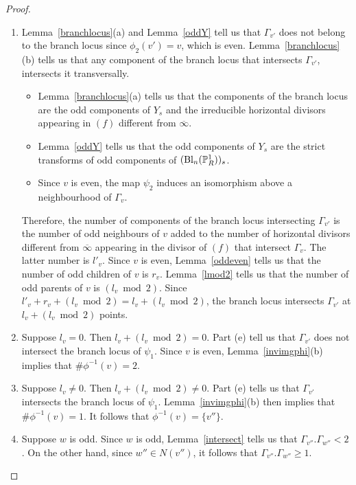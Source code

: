 \begin{proof}
\begin{enumerate}[\upshape (a)]
  \item Lemma~\ref{branchlocus}(a) and Lemma~\ref{oddY} tell us that $\Gamma_{v'}$ does not belong to the branch locus since $\phi_2(v') = v$, which is even. Lemma~\ref{branchlocus}(b) tells us that any component of the branch locus that intersects $\Gamma_{v'}$, intersects it transversally. 
  \begin{itemize}
   \item Lemma~\ref{branchlocus}(a) tells us that the components of the branch locus are the odd components of $Y_s$ and the irreducible horizontal divisors appearing in $(f)$ different from $\overline{\infty}$.
   \item Lemma~\ref{oddY} tells us that the odd components of $Y_s$ are the strict transforms of odd components of $(\mathrm{Bl}_n(\P^1_R))_s$. 
   \item Since $v$ is even, the map $\psi_2$ induces an isomorphism above a neighbourhood of $\Gamma_v$. \end{itemize}
   Therefore, the number of components of the branch locus intersecting $\Gamma_{v'}$ is the number of odd neighbours of $v$ added to the number of horizontal divisors different from $\overline{\infty}$ appearing in the divisor of $(f)$ that intersect $\Gamma_v$. The latter number is $l'_v$. Since $v$ is even, Lemma~\ref{oddeven} tells us that the number of odd children of $v$ is $r_v$. Lemma~\ref{lmod2} tells us that the number of odd parents of $v$ is $(l_v \bmod 2)$. Since $l'_v+r_v+(l_v \bmod 2) = l_v + (l_v \bmod 2)$, the branch locus intersects $\Gamma_{v'}$ at $l_v + (l_v \bmod 2)$ points.
  
  \item Suppose $l_v = 0$. Then $l_v + (l_v \bmod 2) = 0$. Part (e) tell us that $\Gamma_{v'}$ does not intersect the branch locus of $\psi_1$. Since $v$ is even, Lemma~\ref{invimgphi}(b) implies that $\# \phi^{-1}(v) = 2$.
  
  \item Suppose $l_v \neq 0$. Then $l_v + (l_v \bmod 2) \neq 0$. Part (e) tells us that $\Gamma_{v'}$ intersects the branch locus of $\psi_1$. Lemma~\ref{invimgphi}(b) then implies that $\# \phi^{-1}(v) = 1$. It follows that $\phi^{-1}(v) = \{ v'' \}$.
  
  \item Suppose $w$ is odd. Since $w$ is odd, Lemma~\ref{intersect} tells us that $\Gamma_{v''}.\Gamma_{w''} < 2$. On the other hand, since $w'' \in N(v'')$, it follows that $\Gamma_{v''}.\Gamma_{w''} \geq 1$. 
  

\end{enumerate}
\end{proof}
